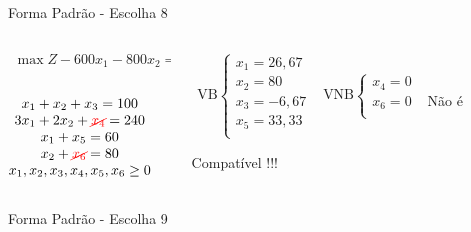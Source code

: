 \begin{frame}
{\begin{block}{Forma Padrão - {\color{cyan}Escolha 8}}
			\begin{columns}
				\begin{column}{0.35\textwidth}
					$
						\begin{matrix}
							\max Z - 600x_1 - 800x_2 = 0 \\
						\end{matrix}
					$ \\
					 \\
					$
						\begin{matrix}
							x_1  + x_2  + x_3                   = 100 \\
							3x_1 + 2x_2       + {\color{red}\cancel{x_4}}             = 240 \\
							x_1                     + x_5       = 60 \\
							x_2                           + {\color{red}\cancel{x_6}} = 80 \\
							x_1,x_2, x_3, x_4, x_5, x_6 \ge 0 \\
						\end{matrix}
					$
				\end{column}
				\vline
				\hspace{0.1cm}
				\begin{column}{0.55\textwidth}
						$
							\begin{matrix}
								\text{VB} \left\{  \begin{matrix}
																 x_1 = 26,67 \\
																 x_2 = 80 \\
																 x_3 = -6,67 \\
																 x_5 = 33,33 \\
												   \end{matrix} 
										   \right.
								&
								\text{VNB} \left\{  \begin{matrix}
																 x_4 = 0 \\
																 x_6 = 0 \\
												   \end{matrix} 
										   \right. 
								\\
							 & \\
							\end{matrix}
						$
						{\color{red}Não é Compatível !!!}
				\end{column}
			\end{columns}
		\end{block}
	}
	{
		\begin{block}{Forma Padrão - {\color{cyan}Escolha 9}}

\end{block}}
\end{frame}
